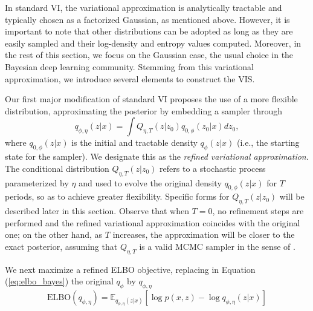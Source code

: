 In standard VI, the variational approximation %
is analytically tractable and typically chosen as a factorized Gaussian, as mentioned above. {However, it is important to note that 
other distributions can be adopted as long as they 
are easily sampled and their log-density and entropy values
computed. Moreover, in the rest of this section, we focus on the Gaussian case, the usual choice in the Bayesian deep learning community.}
Stemming from {this variational approximation}, we introduce several elements to construct the VIS.

Our first major modification of standard VI proposes the use of a more
flexible distribution, approximating the posterior by embedding a sampler through
\begin{equation}\label{eq:q}
q_{\phi,\eta}(z|x) = \int Q_{\eta, T}(z|z_0)q_{0,\phi}(z_0|x)dz_0,
\end{equation}
where $q_{0,\phi} (z | x)$ is the initial and tractable density
$q_{\phi} (z | x)$
(i.e., the starting state for the sampler). %
We designate this as the \emph{refined variational approximation}.
The conditional distribution $Q_{\eta, T}(z|z_0)$ refers
to a stochastic process parameterized by $\eta$ and 
used to evolve the original density $q_{0,\phi}(z|x)$
for $T$ periods, so as to achieve greater flexibility. Specific 
forms for $Q_{\eta, T}(z|z_0)$
will be described later in this section.
{Observe that when $T=0$, no refinement steps are performed and the refined variational approximation coincides with the original one; on the other hand, as 
 $T$ increases, the approximation will be closer to the exact posterior, assuming that $Q_{\eta, T}$ is a valid MCMC sampler
 in the sense of \parencite{ma2015complete}}.

We next maximize a refined ELBO objective, replacing in Equation (\ref{eq:elbo_bayes}) the 
original $q_{\phi }$ 
by $q_{\phi, \eta}$
\begin{equation}\label{eq:elbo_bayes2}
\mbox{ELBO}(q_{\phi,\eta}) = \mathbb{E}_{q_{\phi, \eta}(z|x)} \left[ \log p(x,z) - \log q_{\phi, \eta}(z|x)\right]
\end{equation}

